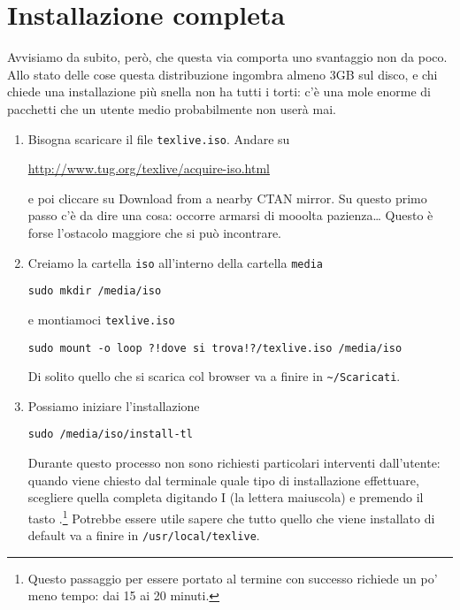 
\section{Installazione completa}

Avvisiamo da subito, però, che questa via comporta uno svantaggio non da poco. Allo stato delle cose questa distribuzione ingombra almeno 3GB sul disco, e chi chiede una installazione più snella non ha tutti i torti: c'è una mole enorme di pacchetti che un utente medio probabilmente non userà mai.

\begin{enumerate}

\item Bisogna scaricare il file \lstinline£texlive.iso£. Andare su
\begin{center}
\url{http://www.tug.org/texlive/acquire-iso.html}
\end{center}
e poi cliccare su {\sf Download from a nearby CTAN mirror}. Su questo primo passo c'è da dire una cosa: occorre armarsi di mooolta pazienza\dots{} Questo è forse l'ostacolo maggiore che si può incontrare.

\item Creiamo la cartella \lstinline£iso£ all'interno della cartella \lstinline£media£
\begin{lstlisting}
sudo mkdir /media/iso
\end{lstlisting}
e montiamoci \lstinline£texlive.iso£
\begin{lstlisting}
sudo mount -o loop ?!dove si trova!?/texlive.iso /media/iso
\end{lstlisting}
Di solito quello che si scarica col browser va a finire in \lstinline£~/Scaricati£.

\item Possiamo iniziare l'installazione
\begin{lstlisting}
sudo /media/iso/install-tl
\end{lstlisting}
Durante questo processo non sono richiesti particolari interventi dall'utente: quando viene chiesto dal terminale quale tipo di installazione effettuare, scegliere quella completa digitando {\sf I} (la lettera  maiuscola) e premendo il tasto \invio{}.\footnote{Questo passaggio per essere portato al termine con successo richiede un po' meno tempo: dai 15 ai 20 minuti.} Potrebbe essere utile sapere che tutto quello che viene installato di default va a finire in \lstinline£/usr/local/texlive£.


\end{enumerate}
